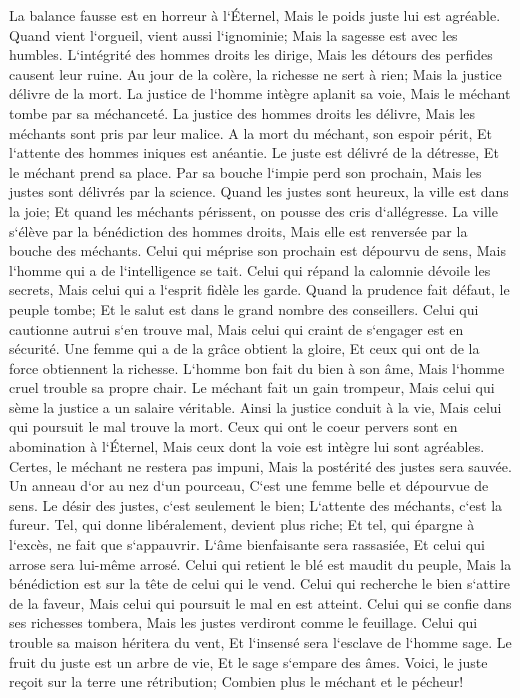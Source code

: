 \verse La balance fausse est en horreur à l`Éternel, Mais le poids juste lui est agréable. 
\verse Quand vient l`orgueil, vient aussi l`ignominie; Mais la sagesse est avec les humbles. 
\verse L`intégrité des hommes droits les dirige, Mais les détours des perfides causent leur ruine. 
\verse Au jour de la colère, la richesse ne sert à rien; Mais la justice délivre de la mort. 
\verse La justice de l`homme intègre aplanit sa voie, Mais le méchant tombe par sa méchanceté. 
\verse La justice des hommes droits les délivre, Mais les méchants sont pris par leur malice. 
\verse A la mort du méchant, son espoir périt, Et l`attente des hommes iniques est anéantie. 
\verse Le juste est délivré de la détresse, Et le méchant prend sa place. 
\verse Par sa bouche l`impie perd son prochain, Mais les justes sont délivrés par la science. 
\verse Quand les justes sont heureux, la ville est dans la joie; Et quand les méchants périssent, on pousse des cris d`allégresse. 
\verse La ville s`élève par la bénédiction des hommes droits, Mais elle est renversée par la bouche des méchants. 
\verse Celui qui méprise son prochain est dépourvu de sens, Mais l`homme qui a de l`intelligence se tait. 
\verse Celui qui répand la calomnie dévoile les secrets, Mais celui qui a l`esprit fidèle les garde. 
\verse Quand la prudence fait défaut, le peuple tombe; Et le salut est dans le grand nombre des conseillers. 
\verse Celui qui cautionne autrui s`en trouve mal, Mais celui qui craint de s`engager est en sécurité. 
\verse Une femme qui a de la grâce obtient la gloire, Et ceux qui ont de la force obtiennent la richesse. 
\verse L`homme bon fait du bien à son âme, Mais l`homme cruel trouble sa propre chair. 
\verse Le méchant fait un gain trompeur, Mais celui qui sème la justice a un salaire véritable. 
\verse Ainsi la justice conduit à la vie, Mais celui qui poursuit le mal trouve la mort. 
\verse Ceux qui ont le coeur pervers sont en abomination à l`Éternel, Mais ceux dont la voie est intègre lui sont agréables. 
\verse Certes, le méchant ne restera pas impuni, Mais la postérité des justes sera sauvée. 
\verse Un anneau d`or au nez d`un pourceau, C`est une femme belle et dépourvue de sens. 
\verse Le désir des justes, c`est seulement le bien; L`attente des méchants, c`est la fureur. 
\verse Tel, qui donne libéralement, devient plus riche; Et tel, qui épargne à l`excès, ne fait que s`appauvrir. 
\verse L`âme bienfaisante sera rassasiée, Et celui qui arrose sera lui-même arrosé. 
\verse Celui qui retient le blé est maudit du peuple, Mais la bénédiction est sur la tête de celui qui le vend. 
\verse Celui qui recherche le bien s`attire de la faveur, Mais celui qui poursuit le mal en est atteint. 
\verse Celui qui se confie dans ses richesses tombera, Mais les justes verdiront comme le feuillage. 
\verse Celui qui trouble sa maison héritera du vent, Et l`insensé sera l`esclave de l`homme sage. 
\verse Le fruit du juste est un arbre de vie, Et le sage s`empare des âmes. 
\verse Voici, le juste reçoit sur la terre une rétribution; Combien plus le méchant et le pécheur! 

